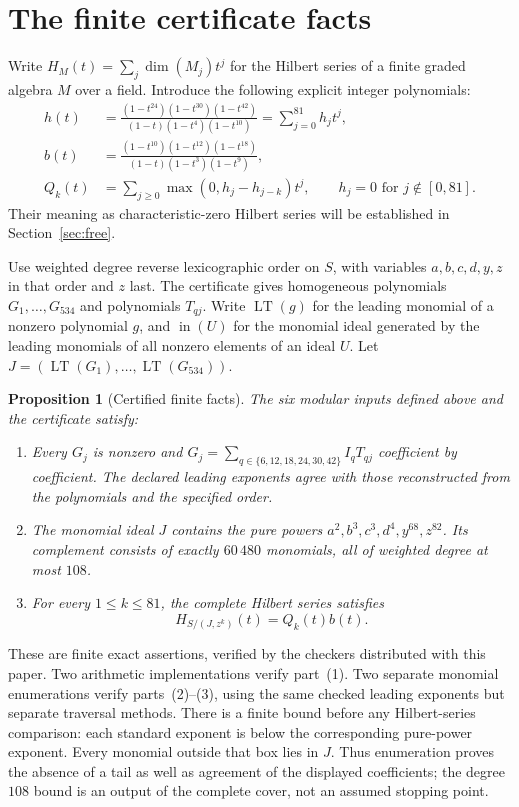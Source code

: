 \documentclass[11pt]{article}
\newtheorem{proposition}[theorem]{Proposition}
\theoremstyle{definition}
\newcommand{\ini}{\operatorname{in}}
\newcommand{\LT}{\operatorname{LT}}
\newcommand{\degrees}{\{6,12,18,24,30,42\}}
\begin{document}
\section{The finite certificate facts}\label{sec:finite}
Write $H_M(t)=\sum_j\dim(M_j)t^j$ for the Hilbert series of a finite
graded algebra $M$ over a field. Introduce the following explicit integer
polynomials:
\begin{align}
 h(t)&=\frac{(1-t^{24})(1-t^{30})(1-t^{42})}
                   {(1-t)(1-t^4)(1-t^{10})}
             =\sum_{j=0}^{81}h_jt^j,\label{eq:h}\\
 b(t)&=\frac{(1-t^{10})(1-t^{12})(1-t^{18})}
                   {(1-t)(1-t^3)(1-t^9)},\label{eq:b}\\
 Q_k(t)&=\sum_{j\geq0}\max(0,h_j-h_{j-k})t^j,
                     \qquad h_j=0\text{ for }j\notin[0,81].\label{eq:Q}
\end{align}
Their meaning as characteristic-zero Hilbert series will be established
in Section~\ref{sec:free}.

Use weighted degree reverse lexicographic order on $S$, with variables
$a,b,c,d,y,z$ in that order and $z$ last. The certificate gives
homogeneous polynomials $G_1,\ldots,G_{534}$ and polynomials $T_{qj}$.
Write $\LT(g)$ for the leading monomial of a nonzero polynomial $g$,
and $\ini(U)$ for the monomial ideal generated by the leading monomials
of all nonzero elements of an ideal $U$.
Let $J=(\LT(G_1),\ldots,\LT(G_{534}))$.

\begin{proposition}[Certified finite facts]\label{prop:finite}
The six modular inputs defined above and the certificate satisfy:
\begin{enumerate}
\item Every $G_j$ is nonzero and
$G_j=\sum_{q\in\degrees}I_qT_{qj}$ coefficient by coefficient.
The declared leading exponents agree with those reconstructed from
the polynomials and the specified order.
\item The monomial ideal $J$ contains the pure powers
$a^2,b^3,c^3,d^4,y^{68},z^{82}$. Its complement consists of exactly
$60\,480$ monomials, all of weighted degree at most $108$.
\item For every $1\leq k\leq81$, the complete Hilbert series satisfies
\[
                          H_{S/(J,z^k)}(t)=Q_k(t)b(t).
\]
\end{enumerate}
\end{proposition}

These are finite exact assertions, verified by the checkers distributed
with this paper. Two arithmetic implementations verify part~(1).
Two separate monomial enumerations verify parts~(2)--(3), using the
same checked leading exponents but separate traversal methods.
There is a finite bound before any Hilbert-series comparison: each
standard exponent is below the corresponding pure-power exponent.
Every monomial outside that box lies in $J$. Thus enumeration proves
the absence of a tail as well as agreement of the displayed
coefficients; the degree $108$ bound is an output of the complete
cover, not an assumed stopping point.
\end{document}
